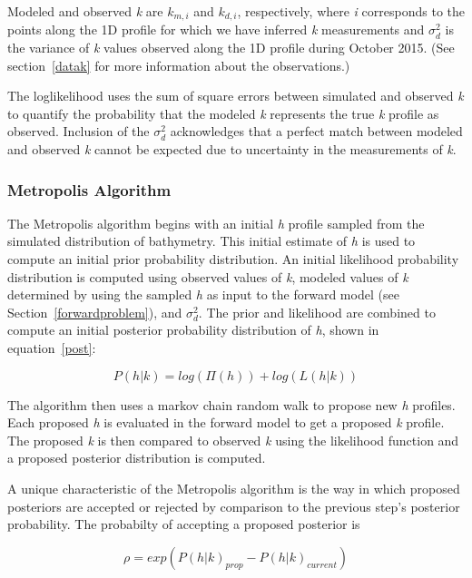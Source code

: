 Modeled and observed \textit{k} are ${k}_{m,i}$ and $k_{d,i}$, respectively, where \textit{i} corresponds to the points along the 1D profile for which we have inferred \textit{k} measurements and $\sigma_{d}^2$ is the variance of \textit{k} values observed along the 1D profile during October 2015. (See section~\ref{datak} for more information about the observations.) 

The loglikelihood uses the sum of square errors between simulated and observed \textit{k} to quantify the probability that the modeled \textit{k} represents the true \textit{k} profile as observed. Inclusion of the $\sigma_{d}^2$ acknowledges that a perfect match between modeled and observed \textit{k} cannot be expected due to uncertainty in the measurements of \textit{k}.

\subsubsection{Metropolis Algorithm}
The Metropolis algorithm begins with an initial \textit{h} profile sampled from the simulated distribution of bathymetry. This initial estimate of \textit{h} is used to compute an initial prior probability distribution. An initial likelihood probability distribution is computed using observed values of \textit{k}, modeled values of \textit{k} determined by using the sampled \textit{h} as input to the forward model (see Section~\ref{forwardproblem}), and $\sigma_{d}^2$. The prior and likelihood are combined to compute an initial posterior probability distribution of \textit{h}, shown in equation~\ref{post}:

\begin{equation}\label{post}
P(h|%
k) = log(\Pi(h)) + log(L(h|%
k))
\end{equation}

The algorithm then uses a markov chain random walk to propose new \textit{h} profiles. Each proposed \textit{h} is evaluated in the forward model to get a proposed \textit{k} profile. The proposed \textit{k} is then compared to observed \textit{k} using the likelihood function and a proposed posterior distribution is computed.

A unique characteristic of the Metropolis algorithm is the way in which proposed posteriors are accepted or rejected by comparison to the previous step's posterior probability. The probabilty of accepting a proposed posterior is 

\begin{equation}\label{accept}
\rho = exp(P(h|%
k)_{prop} - P(h|%
k)_{current})
\end{equation}

